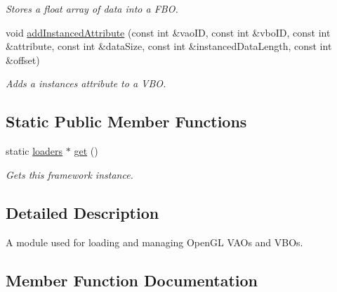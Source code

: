 \begin{DoxyCompactItemize}
\begin{DoxyCompactList}\small\item\em Stores a float array of data into a F\+BO. \end{DoxyCompactList}\item 
void \hyperlink{classflounder_1_1loaders_a7cc2f160a14328dc08292d194e9ad478}{add\+Instanced\+Attribute} (const int \&vao\+ID, const int \&vbo\+ID, const int \&attribute, const int \&data\+Size, const int \&instanced\+Data\+Length, const int \&offset)
\begin{DoxyCompactList}\small\item\em Adds a instances attribute to a V\+BO. \end{DoxyCompactList}\end{DoxyCompactItemize}
\subsection*{Static Public Member Functions}
\begin{DoxyCompactItemize}
\item 
static \hyperlink{classflounder_1_1loaders}{loaders} $\ast$ \hyperlink{classflounder_1_1loaders_ac57855261d2d43c545cac42e9efe981a}{get} ()
\begin{DoxyCompactList}\small\item\em Gets this framework instance. \end{DoxyCompactList}\end{DoxyCompactItemize}


\subsection{Detailed Description}
A module used for loading and managing Open\+GL V\+AO\textquotesingle{}s and V\+BO\textquotesingle{}s. 



\subsection{Member Function Documentation}
\mbox{\label{classflounder_1_1loaders_a7cc2f160a14328dc08292d194e9ad478}} 
